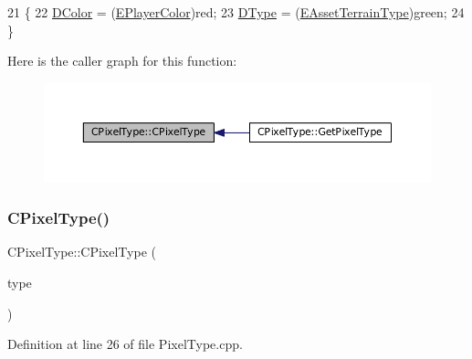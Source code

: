 \begin{DoxyCode}
21                                                   \{
22     \hyperlink{classCPixelType_a474243cf748aee94cfa207659e940b6c}{DColor} = (\hyperlink{GameDataTypes_8h_aafb0ca75933357ff28a6d7efbdd7602f}{EPlayerColor})red;
23     \hyperlink{classCPixelType_aca37f042b510a349e0d3209c73ae51c5}{DType} = (\hyperlink{classCPixelType_af06457fd1c2ff34c67ce670e633a10b0}{EAssetTerrainType})green;
24 \}
\end{DoxyCode}
Here is the caller graph for this function\+:\nopagebreak
\begin{figure}[H]
\begin{center}
\leavevmode
\includegraphics[width=350pt]{classCPixelType_a393381dca7114d6279bcee1e5f280e4b_icgraph}
\end{center}
\end{figure}
\hypertarget{classCPixelType_a8adc1d375b7d644025dcca8ff0849c76}{}\label{classCPixelType_a8adc1d375b7d644025dcca8ff0849c76} 
\subsubsection{\texorpdfstring{C\+Pixel\+Type()}{CPixelType()}\hspace{0.1cm}{\footnotesize\ttfamily [2/4]}}
{\footnotesize\ttfamily C\+Pixel\+Type\+::\+C\+Pixel\+Type (\begin{DoxyParamCaption}\item[{\hyperlink{classCTerrainMap_aff2ab991e237269941416dd79d8871d4}{C\+Terrain\+Map\+::\+E\+Tile\+Type}}]{type }\end{DoxyParamCaption})}



Definition at line 26 of file Pixel\+Type.\+cpp.


